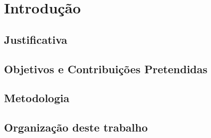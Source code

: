 \chapter{Introdução}
\label{cap:introducao}


\section{Justificativa}



\section{Objetivos e Contribuições Pretendidas}

\section{Metodologia}




\section{Organização deste trabalho}

